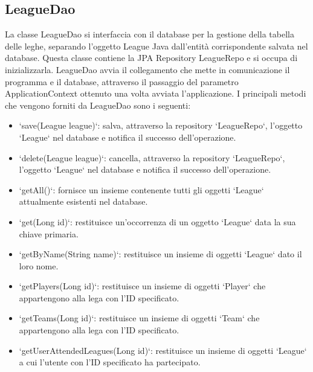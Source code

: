 \documentclass[twoside,openright,titlepage,fleqn,headinclude,12pt,a4paper,BCOR=5mm,footinclude]{scrbook}
\begin{document}
\subsection{LeagueDao} 
La classe LeagueDao si interfaccia con il database per la gestione della tabella delle leghe, separando l'oggetto League Java dall'entità corrispondente salvata nel database. Questa classe contiene la JPA Repository LeagueRepo e si occupa di inizializzarla. LeagueDao avvia il collegamento che mette in comunicazione il programma e il database, attraverso il passaggio del parametro ApplicationContext ottenuto una volta avviata l'applicazione. I principali metodi che vengono forniti da LeagueDao sono i seguenti:  
\begin{itemize}  
    \item `save(League league)`: salva, attraverso la repository `LeagueRepo`, l'oggetto `League` nel database e notifica il successo dell'operazione. 
    \item `delete(League league)`: cancella, attraverso la repository `LeagueRepo`, l'oggetto `League` nel database e notifica il successo dell'operazione. 
    \item `getAll()`: fornisce un insieme contenente tutti gli oggetti `League` attualmente esistenti nel database. 
    \item `get(Long id)`: restituisce un'occorrenza di un oggetto `League` data la sua chiave primaria. 
    \item `getByName(String name)`: restituisce un insieme di oggetti `League` dato il loro nome. 
    \item `getPlayers(Long id)`: restituisce un insieme di oggetti `Player` che appartengono alla lega con l'ID specificato. 
    \item `getTeams(Long id)`: restituisce un insieme di oggetti `Team` che appartengono alla lega con l'ID specificato. 
    \item `getUserAttendedLeagues(Long id)`: restituisce un insieme di oggetti `League` a cui l'utente con l'ID specificato ha partecipato.
\end{itemize}
\end{document}
